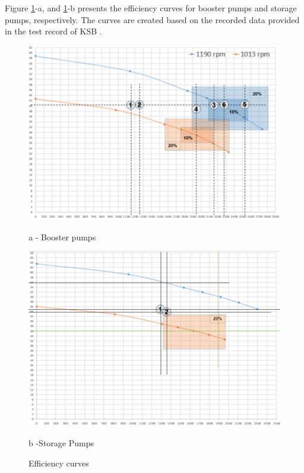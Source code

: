 Figure \ref{ch04_efficiencycurves}-a, and \ref{ch04_efficiencycurves}-b presents the efficiency curves for booster pumps and storage pumps, respectively. The curves are created based on the recorded data provided in the test record of KSB \cite{KSB2010}. 


\begin{figure}[!htb]
	\begin{minipage}[b]{0.5\linewidth}
		\centering
		\includegraphics[width=\textwidth]{figures/ch04_fig_efficiency01}
		\caption*{a - Booster pumps}%
	\end{minipage}
	\hspace{0.05cm}
	\begin{minipage}[b]{0.5\linewidth}
		\centering
		\includegraphics[width=\textwidth]{figures/ch04_fig_efficiency02}
		\caption*{b -Storage Pumps} %
	\end{minipage}
		\caption{Efficiency curves}
		\label{ch04_efficiencycurves}
\end{figure}

